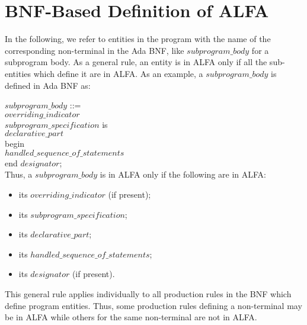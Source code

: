 \documentclass{article}
\newcounter{example}
\newcommand{\bnf}[1]{$\mathit{#1}$}
\begin{document}



\appendix

\section{BNF-Based Definition of ALFA}
\label{sec:bnf-alfa}

In the following, we refer to entities in the program with the name of the
corresponding non-terminal in the Ada BNF, like \bnf{subprogram\_body} for a
subprogram body. As a general rule, an entity is in ALFA only if all the
sub-entities which define it are in ALFA. As an example, a
\bnf{subprogram\_body} is defined in Ada BNF as:

\hspace*{1cm}\bnf{subprogram\_body} ::=\\
\hspace*{2cm}\lbrack\bnf{overriding\_indicator}\rbrack\\
\hspace*{2cm}\bnf{subprogram\_specification} is\\
\hspace*{3cm}  \bnf{declarative\_part}\\
\hspace*{2cm}  begin\\
\hspace*{3cm}    \bnf{handled\_sequence\_of\_statements}\\
\hspace*{2cm}  end \lbrack\bnf{designator}\rbrack;\\

Thus, a \bnf{subprogram\_body} is in ALFA only if the following are in ALFA:
\begin{itemize}
\item its \bnf{overriding\_indicator} (if present);
\item its \bnf{subprogram\_specification};
\item its \bnf{declarative\_part};
\item its \bnf{handled\_sequence\_of\_statements};
\item its \bnf{designator} (if present).
\end{itemize}

This general rule applies individually to all production rules in the BNF
which define program entities. Thus, some production rules defining a
non-terminal may be in ALFA while others for the same non-terminal are not in
ALFA.
\end{document}
